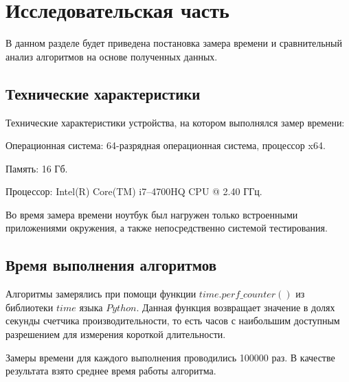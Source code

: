 \chapter{Исследовательская часть}

В данном разделе будет приведена постановка замера времени и сравнительный анализ алгоритмов на основе полученных данных.

\section{Технические характеристики}

Технические характеристики устройства, на котором выполнялся замер времени:

Операционная система: 64-разрядная операционная система, процессор x64.


Память: 16 Гб.


Процессор: Intel(R) Core(TM) i7--4700HQ CPU @ 2.40 ГГц.


Во время замера времени ноутбук был нагружен только встроенными приложениями окружения, а также непосредственно системой тестирования.

\section{Время выполнения алгоритмов}

Алгоритмы замерялись при помощи функции $time.perf\_counter()$ из библиотеки $time$ языка $Python$. Данная функция возвращает значение в долях секунды счетчика производительности, то есть часов с наибольшим доступным разрешением для измерения короткой длительности.

Замеры времени для каждого выполнения проводились 100000 раз. В качестве результата взято среднее время работы алгоритма.

